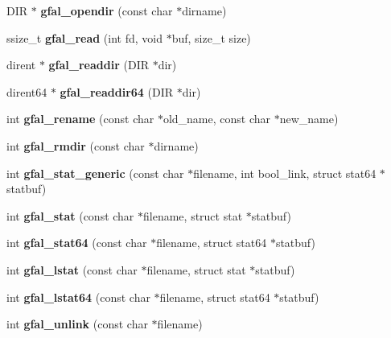 \begin{CompactItemize}
\item 
DIR $\ast$ \textbf{gfal\_\-opendir} (const char $\ast$dirname)\label{group__posix__group_g004ad5efbd544da820823e597e57be92}

\item 
ssize\_\-t \textbf{gfal\_\-read} (int fd, void $\ast$buf, size\_\-t size)\label{group__posix__group_gaa6bfe36f33b86e489b798aed96912de}

\item 
dirent $\ast$ \textbf{gfal\_\-readdir} (DIR $\ast$dir)\label{group__posix__group_g2a8ed205f7748d7817a18521268a1f2d}

\item 
dirent64 $\ast$ \textbf{gfal\_\-readdir64} (DIR $\ast$dir)\label{gfal__posix_8c_ad202b2730efde51021b620bce0d1683}

\item 
int \textbf{gfal\_\-rename} (const char $\ast$old\_\-name, const char $\ast$new\_\-name)\label{group__posix__group_g34dc6129530d6bf9e5836ef22c0d2792}

\item 
int \textbf{gfal\_\-rmdir} (const char $\ast$dirname)\label{group__posix__group_gcc4b6347640a722674c2d6df437490df}

\item 
int \textbf{gfal\_\-stat\_\-generic} (const char $\ast$filename, int bool\_\-link, struct stat64 $\ast$statbuf)\label{gfal__posix_8c_678840d435b1b1a34645fa21d34e1102}

\item 
int \textbf{gfal\_\-stat} (const char $\ast$filename, struct stat $\ast$statbuf)\label{group__posix__group_g1d8c86d522d5dd26ee7ddcd9c6925964}

\item 
int \textbf{gfal\_\-stat64} (const char $\ast$filename, struct stat64 $\ast$statbuf)\label{group__posix__group_gb40e2d23618763284ab4a1fb1a06a880}

\item 
int \textbf{gfal\_\-lstat} (const char $\ast$filename, struct stat $\ast$statbuf)\label{group__posix__group_g347f867802a33bc04fdfb769da857103}

\item 
int \textbf{gfal\_\-lstat64} (const char $\ast$filename, struct stat64 $\ast$statbuf)\label{group__posix__group_g739ca4985a67e0fc4fc253f42df2638c}

\item 
int \textbf{gfal\_\-unlink} (const char $\ast$filename)\label{group__posix__group_gdeb4c6cc47f507da3e3b498374e308fb}


\end{CompactItemize}
